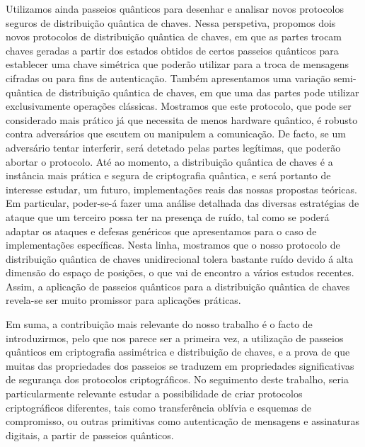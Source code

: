 \documentclass[12pt]{report}
\begin{document}
Utilizamos ainda passeios qu\^{a}nticos para desenhar e analisar novos protocolos seguros de distribui\c{c}\~{a}o qu\^{a}ntica de chaves. Nessa perspetiva, propomos dois novos protocolos de distribui\c{c}\~{a}o qu\^{a}ntica de chaves, em que as partes trocam chaves geradas a partir dos estados obtidos de certos passeios qu\^{a}nticos para establecer uma chave sim\'{e}trica que poder\~{a}o utilizar para a troca de mensagens cifradas ou para fins de autentica\c{c}\~{a}o. Tamb\'{e}m apresentamos uma varia\c{c}\~{a}o semi-qu\^{a}ntica de distribui\c{c}\~{a}o qu\^{a}ntica de chaves, em que uma das partes pode utilizar exclusivamente opera\c{c}\~{o}es cl\'{a}ssicas. Mostramos que este protocolo, que pode ser considerado mais pr\'{a}tico j\'{a} que necessita de menos hardware qu\^{a}ntico, \'{e} robusto contra advers\'{a}rios que escutem ou manipulem a comunica\c{c}\~{a}o. De facto, se um advers\'{a}rio tentar interferir, ser\'{a} detetado pelas partes leg\'{i}timas, que poder\~{a}o abortar o protocolo. At\'{e} ao momento, a distribui\c{c}\~{a}o qu\^{a}ntica de chaves \'{e} a instância mais pr\'{a}tica e segura de criptografia qu\^{a}ntica, e ser\'{a} portanto de interesse estudar, um futuro, implementa\c{c}\~{o}es reais das nossas propostas te\'{o}ricas. Em particular, poder-se-\'{a} fazer uma an\'{a}lise detalhada das diversas estrat\'{e}gias de ataque que um terceiro possa ter na presen\c{c}a de ru\'{i}do, tal como se poder\'{a} adaptar os ataques e defesas gen\'{e}ricos que apresentamos para o caso de implementa\c{c}\~{o}es espec\'{i}ficas. Nesta linha, mostramos que o nosso protocolo de distribui\c{c}\~{a}o qu\^{a}ntica de chaves unidirecional tolera bastante ru\'{i}do devido \'{a} alta dimens\~{a}o do espa\c{c}o de posi\c{c}\~{o}es, o que vai de encontro a v\'{a}rios estudos recentes. Assim, a aplica\c{c}\~{a}o de passeios qu\^{a}nticos para a distribui\c{c}\~{a}o qu\^{a}ntica de chaves revela-se ser muito promissor para aplica\c{c}\~{o}es pr\'{a}ticas.



Em suma, a contribui\c{c}\~{a}o mais relevante do nosso trabalho \'{e} o facto de introduzirmos, pelo que nos parece ser a primeira vez, a utiliza\c{c}\~{a}o de passeios qu\^{a}nticos em criptografia assim\'{e}trica e distribui\c{c}\~{a}o de chaves, e a prova de que muitas das propriedades dos passeios se traduzem em propriedades significativas de seguran\c{c}a dos protocolos criptogr\'{a}ficos. No seguimento deste trabalho, seria particularmente relevante estudar a possibilidade de criar protocolos criptogr\'{a}ficos diferentes, tais como transfer\^{e}ncia obl\'{i}via e esquemas de compromisso, ou outras primitivas como autentica\c{c}\~{a}o de mensagens e assinaturas digitais, a partir de passeios qu\^{a}nticos.
\end{document}
